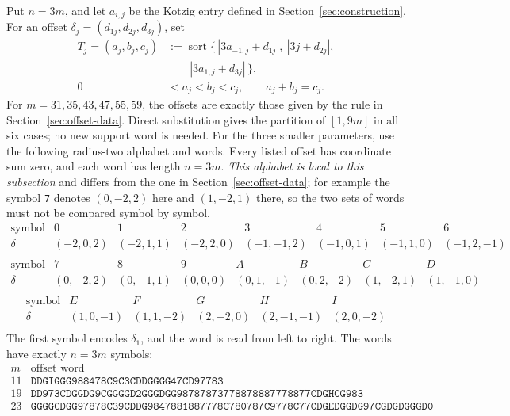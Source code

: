 Put \(n=3m\), and let \(a_{i,j}\) be the Kotzig entry defined in
Section~\ref{sec:construction}.  For an offset \(\delta_j=(d_{1j},d_{2j},d_{3j})\), set
\[
\begin{aligned}
T_j=(a_j,b_j,c_j)&:=\operatorname{sort}\{\,|3a_{-1,j}+d_{1j}|,\ |3j+d_{2j}|,\\
&\qquad |3a_{1,j}+d_{3j}|\,\},\\
0&<a_j<b_j<c_j,\qquad a_j+b_j=c_j.
\end{aligned}
\]
For \(m=31,35,43,47,55,59\), the offsets are exactly those given by the rule in
Section~\ref{sec:offset-data}.
Direct substitution gives the partition of \([1,9m]\) in all six cases; no new support word is
needed.  For the three smaller parameters, use the following radius-two alphabet and words.
Every listed offset has coordinate sum zero, and each word has length $n=3m$.
\emph{This alphabet is local to this subsection} and differs from the one in
Section~\ref{sec:offset-data}; for example the symbol \texttt{7} denotes \((0,-2,2)\) here and
\((1,-2,1)\) there, so the two sets of words must not be compared symbol by symbol.
\begingroup\scriptsize
\[
\begin{array}{c|ccccccc}
\text{symbol}&0&1&2&3&4&5&6\\\hline
\delta&(-2,0,2)&(-2,1,1)&(-2,2,0)&(-1,-1,2)&(-1,0,1)&(-1,1,0)&(-1,2,-1)\\
\end{array}
\]
\endgroup
\begingroup\scriptsize
\[
\begin{array}{c|ccccccc}
\text{symbol}&7&8&9&A&B&C&D\\\hline
\delta&(0,-2,2)&(0,-1,1)&(0,0,0)&(0,1,-1)&(0,2,-2)&(1,-2,1)&(1,-1,0)\\
\end{array}
\]
\endgroup
\begingroup\scriptsize
\[
\begin{array}{c|ccccc}
\text{symbol}&E&F&G&H&I\\\hline
\delta&(1,0,-1)&(1,1,-2)&(2,-2,0)&(2,-1,-1)&(2,0,-2)\\
\end{array}
\]
\endgroup
The first symbol encodes \(\delta_1\), and the word is read from left to right.  The words
have exactly $n=3m$ symbols:
\[
\begin{array}{c|l}
m&\text{offset word}\\\hline
11&\mathtt{DDGIGGG988478C9C3CDDGGGG47CD97783}\\
19&\mathtt{DD973CDGGDG9CGGGGD2GGGDGG98787873778878887778877CDGHCG983}\\
23&\mathtt{GGGGCDGG97878C39CDDG9847881887778C780787C9778C77CDGEDGGDG97CGDGDGGGD0}\\
\end{array}
\]
